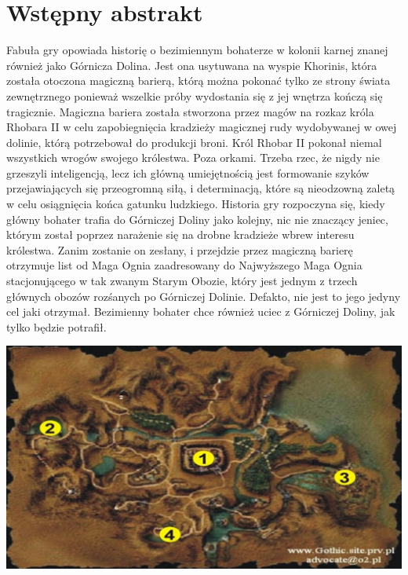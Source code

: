 \documentclass[11pt,polish, openany]{book}
\begin{document}
\chapter{Wstępny abstrakt}\label{chapt:sum}
Fabuła gry opowiada historię o bezimiennym bohaterze w kolonii karnej znanej również jako Górnicza Dolina.
Jest ona usytuwana na wyspie Khorinis, która została otoczona magiczną barierą, którą można pokonać
tylko ze strony świata zewnętrznego ponieważ wszelkie próby wydostania się z jej wnętrza kończą się tragicznie.
Magiczna bariera została stworzona przez magów na rozkaz króla Rhobara II w celu zapobiegnięcia kradzieży
magicznej rudy wydobywanej w owej dolinie, którą potrzebował do produkcji broni.
Król Rhobar II pokonał niemal wszystkich wrogów swojego królestwa. Poza orkami. Trzeba rzec, że nigdy nie grzeszyli
inteligencją, lecz ich główną umiejętnością jest formowanie szyków przejawiających się przeogromną siłą, i 
determinacją, które są nieodzowną zaletą w celu osiągnięcia końca gatunku ludzkiego. Historia gry rozpoczyna się, kiedy
główny bohater trafia do Górniczej Doliny jako kolejny, nic nie znaczący jeniec, którym został poprzez narażenie się na drobne
kradzieże wbrew interesu królestwa. Zanim zostanie on zesłany, i przejdzie przez magiczną barierę otrzymuje list od Maga Ognia
zaadresowany do Najwyższego Maga Ognia stacjonującego w tak zwanym Starym Obozie, który jest jednym z trzech głównych obozów rozśanych po
Górniczej Dolinie. Defakto, nie jest to jego jedyny cel jaki otrzymał. Bezimienny bohater chce również uciec z Górniczej Doliny, jak tylko będzie
potrafił.

\includegraphics[scale=0.9]{mapa.jpg}
\end{document}
